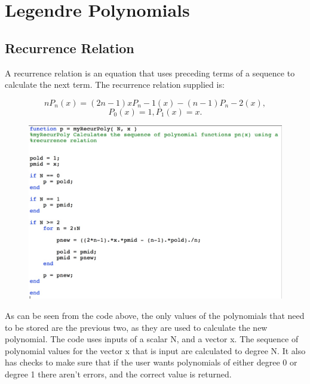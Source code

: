 \documentclass[a4paper]{article}
\begin{document}
\section{Legendre Polynomials}

\subsection{Recurrence Relation}


A recurrence relation is an equation that uses preceding terms of a sequence to calculate the next term. The recurrence relation supplied is:


$$nP_n(x)=(2n-1)xP_n-1(x)-(n-1)P_n-2(x),$$ $$ P_0(x)=1, P_1(x)=x.$$
\newline

\begin{figure}[H]
\includegraphics[width=1\textwidth]{recurrencerelationcode.jpg}
\end{figure}


\noindent As can be seen from the code above, the only values of the polynomials that need to be stored are the previous two, as they are used to calculate the new polynomial. The code uses inputs of a scalar N, and a vector x. The sequence of polynomial values for the vector x that is input are calculated to degree N. It also has checks to make sure that if the user wants polynomials of either degree 0 or degree 1 there aren't errors, and the correct value is returned.


\subsection{}
\subsection{}
\subsection{}
\subsection{}
\end{document}

